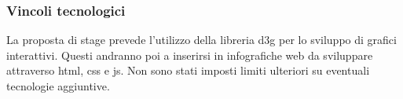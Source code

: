 \subsubsection{Vincoli tecnologici}
La proposta di stage prevede l'utilizzo della libreria \gls{d3g} per lo sviluppo
di grafici interattivi. Questi andranno poi a inserirsi in infografiche web da 
sviluppare attraverso \gls{html}, \gls{css} e \gls{js}.
Non sono stati imposti limiti ulteriori su eventuali tecnologie aggiuntive.



